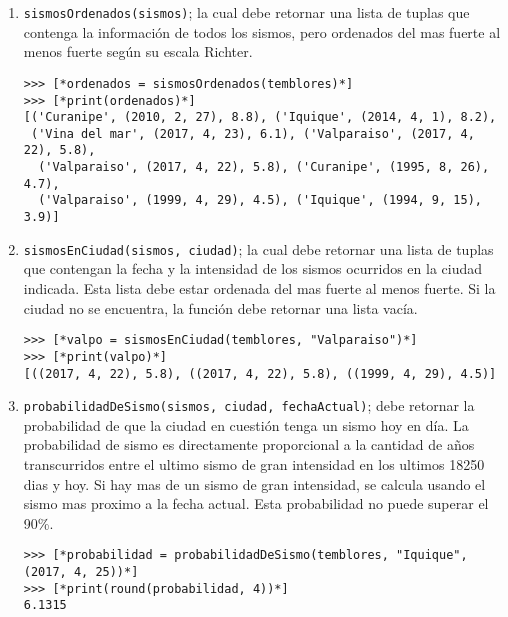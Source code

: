 \begin{enumerate}

\item \texttt{sismosOrdenados(sismos)}; la cual debe retornar una lista de tuplas que contenga la información de todos los sismos, pero ordenados del mas fuerte al menos fuerte según su escala Richter.

\begin{lstlisting}[style=consola]
>>> [*ordenados = sismosOrdenados(temblores)*]
>>> [*print(ordenados)*]
[('Curanipe', (2010, 2, 27), 8.8), ('Iquique', (2014, 4, 1), 8.2), 
 ('Vina del mar', (2017, 4, 23), 6.1), ('Valparaiso', (2017, 4, 22), 5.8), 
  ('Valparaiso', (2017, 4, 22), 5.8), ('Curanipe', (1995, 8, 26), 4.7), 
  ('Valparaiso', (1999, 4, 29), 4.5), ('Iquique', (1994, 9, 15), 3.9)]
\end{lstlisting}

\item \texttt{sismosEnCiudad(sismos, ciudad)}; la cual debe retornar una lista de tuplas que contengan la fecha y la intensidad de los sismos ocurridos en la ciudad indicada. Esta lista debe estar ordenada del mas fuerte al menos fuerte. Si la ciudad no se encuentra, la función debe retornar una lista vacía.

\begin{lstlisting}[style=consola]
>>> [*valpo = sismosEnCiudad(temblores, "Valparaiso")*]
>>> [*print(valpo)*]
[((2017, 4, 22), 5.8), ((2017, 4, 22), 5.8), ((1999, 4, 29), 4.5)]
\end{lstlisting}

\item \texttt{probabilidadDeSismo(sismos, ciudad, fechaActual)}; debe retornar la probabilidad de que la ciudad en cuestión tenga un sismo hoy en día. La probabilidad de sismo es directamente proporcional a la cantidad de años transcurridos entre el ultimo sismo de gran intensidad en los ultimos 18250 dias y hoy. Si hay mas de un sismo de gran intensidad, se calcula usando el sismo mas proximo a la fecha actual. Esta probabilidad no puede superar el 90\%.

\begin{lstlisting}[style=consola]
>>> [*probabilidad = probabilidadDeSismo(temblores, "Iquique", (2017, 4, 25))*]
>>> [*print(round(probabilidad, 4))*]
6.1315
\end{lstlisting}

\end{enumerate}
